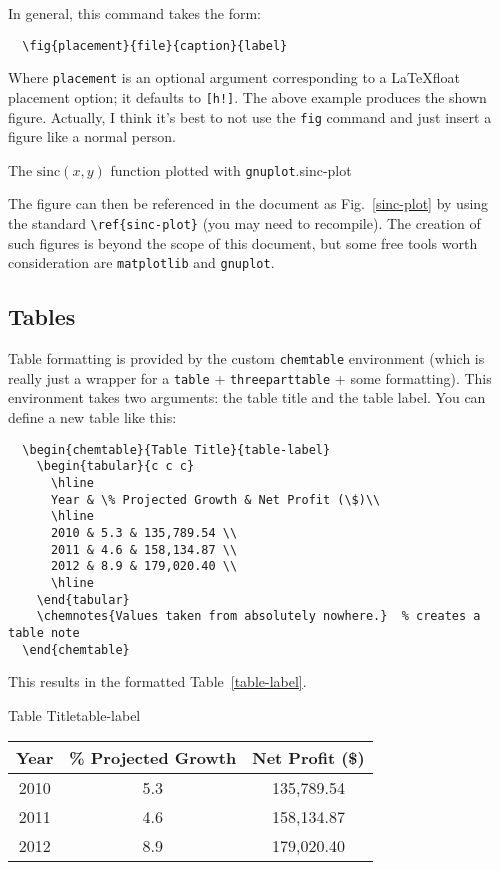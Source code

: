 \documentclass{lab_report}
\begin{document}
In general, this command takes the form:
\begin{verbatim}
  \fig{placement}{file}{caption}{label}
\end{verbatim}

Where \verb|placement| is an optional argument corresponding to a \LaTeX float placement option; it defaults to \verb|[h!]|. The above example produces the shown figure. Actually, I think it's best to not use the \verb|fig| command and just insert a figure like a normal person.

{The $\textrm{sinc}(x, y)$ function plotted with \texttt{gnuplot}.}{sinc-plot}

The figure can then be referenced in the document as Fig.~\ref{sinc-plot} by using the standard \verb|\ref{sinc-plot}| (you may need to recompile). The creation of such figures is beyond the scope of this document, but some free tools worth consideration are \verb|matplotlib| and \verb|gnuplot|.

\subsection{Tables}
Table formatting is provided by the custom \verb|chemtable| environment (which is really just a wrapper for a \verb|table| + \verb|threeparttable| + some formatting). This environment takes two arguments: the table title and the table label. You can define a new table like this:
\begin{verbatim}
  \begin{chemtable}{Table Title}{table-label}
    \begin{tabular}{c c c}
      \hline
      Year & \% Projected Growth & Net Profit (\$)\\
      \hline
      2010 & 5.3 & 135,789.54 \\
      2011 & 4.6 & 158,134.87 \\
      2012 & 8.9 & 179,020.40 \\
      \hline
    \end{tabular}
    \chemnotes{Values taken from absolutely nowhere.}  % creates a table note
  \end{chemtable}
\end{verbatim}

This results in the formatted Table~\ref{table-label}.
\begin{chemtable}{Table Title}{table-label}
  \begin{tabular}{c c c}
    \hline
    Year & \% Projected Growth & Net Profit (\$)\\
    \hline
    2010 & 5.3 & 135,789.54 \\
    2011 & 4.6 & 158,134.87 \\
    2012 & 8.9 & 179,020.40 \\
    \hline
  \end{tabular}
\end{chemtable}
\end{document}
